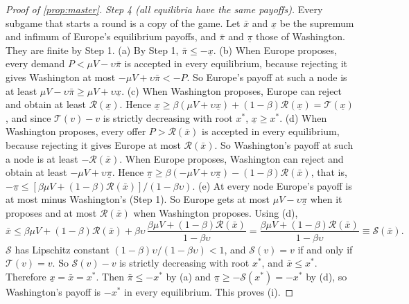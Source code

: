 \begin{proof}[Proof of \cref{prop:master}]
\emph{Step 4 (all equilibria have the same payoffs).} Every subgame that starts a round is a copy of the game. Let $\bar x$ and $\underline x$ be the supremum and infimum of Europe's equilibrium payoffs, and $\bar\pi$ and $\underline\pi$ those of Washington. They are finite by Step 1.
(a) By Step 1, $\bar\pi\le-\underline x$.
(b) When Europe proposes, every demand $P<\mu V-\upsilon\bar\pi$ is accepted in every equilibrium, because rejecting it gives Washington at most $-\mu V+\upsilon\bar\pi<-P$. So Europe's payoff at such a node is at least $\mu V-\upsilon\bar\pi\ge\mu V+\upsilon\underline x$.
(c) When Washington proposes, Europe can reject and obtain at least $\mathcal R(\underline x)$.
Hence $\underline x\ge\beta(\mu V+\upsilon\underline x)+(1-\beta)\mathcal R(\underline x)=\mathcal T(\underline x)$, and since $\mathcal T(v)-v$ is strictly decreasing with root $x^*$, $\underline x\ge x^*$.
(d) When Washington proposes, every offer $P>\mathcal R(\bar x)$ is accepted in every equilibrium, because rejecting it gives Europe at most $\mathcal R(\bar x)$. So Washington's payoff at such a node is at least $-\mathcal R(\bar x)$. When Europe proposes, Washington can reject and obtain at least $-\mu V+\upsilon\underline\pi$. Hence $\underline\pi\ge\beta(-\mu V+\upsilon\underline\pi)-(1-\beta)\mathcal R(\bar x)$, that is, $-\underline\pi\le[\beta\mu V+(1-\beta)\mathcal R(\bar x)]/(1-\beta\upsilon)$.
(e) At every node Europe's payoff is at most minus Washington's (Step 1). So Europe gets at most $\mu V-\upsilon\underline\pi$ when it proposes and at most $\mathcal R(\bar x)$ when Washington proposes. Using (d),
\[
\bar x\le\beta\mu V+(1-\beta)\mathcal R(\bar x)+\beta\upsilon\,\frac{\beta\mu V+(1-\beta)\mathcal R(\bar x)}{1-\beta\upsilon}=\frac{\beta\mu V+(1-\beta)\mathcal R(\bar x)}{1-\beta\upsilon}\equiv\mathcal S(\bar x).
\]
$\mathcal S$ has Lipschitz constant $(1-\beta)\upsilon/(1-\beta\upsilon)<1$, and $\mathcal S(v)=v$ if and only if $\mathcal T(v)=v$. So $\mathcal S(v)-v$ is strictly decreasing with root $x^*$, and $\bar x\le x^*$.
Therefore $\underline x=\bar x=x^*$. Then $\bar\pi\le-x^*$ by (a) and $\underline\pi\ge-\mathcal S(x^*)=-x^*$ by (d), so Washington's payoff is $-x^*$ in every equilibrium. This proves (i).


\end{proof}
